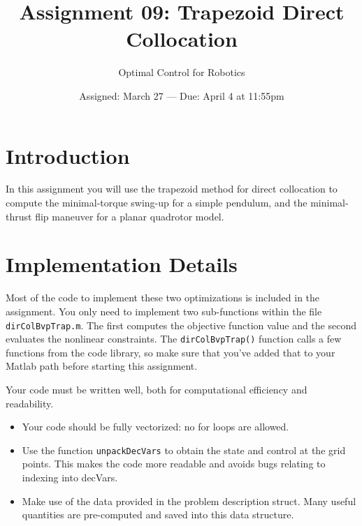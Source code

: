 

\title{Assignment 09:  Trapezoid Direct Collocation}
\date{Assigned:  March 27  ---  Due:  April 4 at 11:55pm}
\author{Optimal Control for Robotics}

\maketitle

\section*{Introduction}

In this assignment you will use the trapezoid method for direct collocation to
compute the minimal-torque swing-up for a simple pendulum,
and the minimal-thrust flip maneuver for a planar quadrotor model.

\section*{Implementation Details}
Most of the code to implement these two optimizations is included in the
assignment. You only need to implement two sub-functions within the file
\texttt{dirColBvpTrap.m}.
The first computes the objective function value and the second evaluates the
nonlinear constraints.
The \texttt{dirColBvpTrap()} function calls a few functions from the code library,
so make sure that you've added that to your Matlab path before starting this assignment.

\par
Your code must be written well, both for computational efficiency and readability.

\vspace{-0.0em} \begin{itemize}  \setlength\itemsep{0em} \setlength\itemindent{18pt}

  \item Your code should be fully vectorized: no for loops are allowed.

  \item Use the function \texttt{unpackDecVars} to obtain the
  state and control at the grid points.
  This makes the code more readable and avoids bugs relating to indexing into decVars.

  \item Make use of the data provided in the problem description struct.
  Many useful quantities are pre-computed and saved into this data structure.

\end{itemize}

